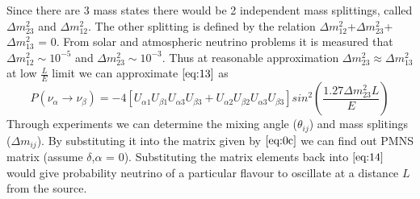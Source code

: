 \documentclass[12pt,a4paper]{report}
\begin{document}
Since there are 3 mass states there would be 2 independent mass splittings, called $\Delta m_{23}^{2}$ and $\Delta m_{12}^{2}$. The other splitting is defined by the relation $\Delta m_{12}^{2}$+$\Delta m_{23}^{2}$+$\Delta m_{13}^{2}$ = 0. From solar and atmospheric neutrino problems it is measured that $\Delta m_{12}^{2}\sim 10^{-5}$ and $\Delta m_{23}^{2} \sim 10^{-3}$. Thus at reasonable approximation $\Delta m_{23}^{2} \approx \Delta m_{13}^{2}$ at low $\frac{L}{E}$ limit we can approximate $\ref{eq:13}$ as
\begin{equation}
\label{eq:14}
P(\nu_{\alpha} \rightarrow \nu_{\beta} ) =-4 [ U_{\alpha 1} U_{\beta 1} U_{\alpha 3} U_{\beta 3} + U_{\alpha 2} U_{\beta 2} U_{\alpha 3} U_{\beta 3}]sin^{2}( \frac{1.27\Delta m_{23}^{2} L}{E})
\end{equation}
Through experiments we can determine the mixing angle ($ \theta_{ij}$) and mass splitings ($\Delta m_{ij}$). By substituting it into the matrix given by $\ref{eq:0c}$ we can find out PMNS matrix (assume $\delta$,$\alpha$ = 0). Substituting the matrix elements back into $\ref{eq:14}$ would give probability neutrino of a particular flavour to oscillate at a distance $L$ from the source.
\newpage
\thispagestyle{empty}
\mbox{}
\newpage
\end{document}
